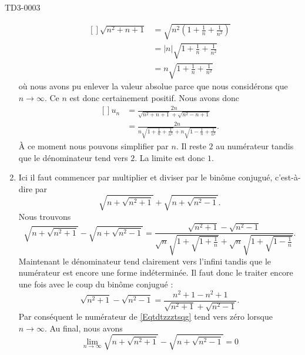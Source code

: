 \begin{corrige}{TD3-0003}
\begin{enumerate}
			\begin{equation}
				\begin{aligned}[]
					\sqrt{n^2+n+1}&=\sqrt{n^2\left( 1+\frac{1}{ n }+\frac{1}{ n^2 } \right)}\\
					&=| n |\sqrt{1+\frac{1}{ n }+\frac{1}{ n^2 }}\\
					&= n \sqrt{1+\frac{1}{ n }+\frac{1}{ n^2 }}
				\end{aligned}
			\end{equation}
			où nous avons pu enlever la valeur absolue parce que nous considérons que $n\to\infty$. Ce $n$ est donc certainement positif. Nous avons donc
			\begin{equation}
				\begin{aligned}[]
					u_n&=\frac{ 2n }{   \sqrt{n^2+n+1}+\sqrt{n^2-n+1}   }\\
					&=\frac{ 2n }{ n \sqrt{1+\frac{1}{ n }+\frac{1}{ n^2 }}+n\sqrt{1-\frac{1}{ n }+\frac{1}{ n^2 }} }.
				\end{aligned}
			\end{equation}
			À ce moment nous pouvons simplifier par $n$. Il reste $2$ au numérateur tandis que le dénominateur tend vers $2$. La limite est donc $1$.
		\item
			Ici il faut commencer par multiplier et diviser par le binôme conjugué, c'est-à-dire par
			\begin{equation}
				\sqrt{n+\sqrt{n^2+1}}+\sqrt{n+\sqrt{n^2-1}}.
			\end{equation}
			Nous trouvons
            \begin{equation}        \label{Eqtdtzzztsqg}
                \sqrt{n+\sqrt{n^2+1}}-\sqrt{n+\sqrt{n^2-1}}=\frac{  \sqrt{n^2+1}-\sqrt{n^2-1} }{ \sqrt{n}\sqrt{1+\sqrt{ 1+\frac{1}{n} }  }+\sqrt{n}\sqrt{1+\sqrt{ 1-\frac{1}{n} }} }.
			\end{equation}
            Maintenant le dénominateur tend clairement vers l'infini tandis que le numérateur est encore une forme indéterminée. Il faut donc le traiter encore une fois avec le coup du binôme conjugué :
            \begin{equation}
                \sqrt{n^2+1}-\sqrt{n^2-1}=\frac{ n^2+1-n^2+1 }{ \sqrt{n^2+1}+\sqrt{n^2-1} }.
            \end{equation}
            Par conséquent le numérateur de \eqref{Eqtdtzzztsqg} tend vers zéro lorsque \( n\to\infty\). Au final, nous avons
            \begin{equation}
                \lim_{n\to \infty} \sqrt{n+\sqrt{n^2+1}}-\sqrt{n+\sqrt{n^2-1}}=0
            \end{equation}

\end{enumerate}
\end{corrige}
